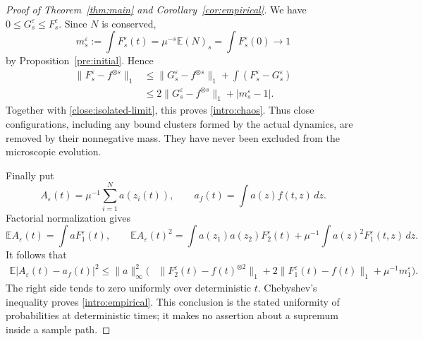 \begin{proof}[Proof of Theorem~\ref{thm:main} and Corollary~\ref{cor:empirical}]
We have $0\leq G_s^\varepsilon\leq F_s^\varepsilon$. Since
$N$ is conserved,
\[
 m_s^\varepsilon:=\int F_s^\varepsilon(t)
 =\mu^{-s}\mathbb E(N)_s
 =\int F_s^\varepsilon(0)\longrightarrow1
\]
by Proposition~\ref{pre:initial}. Hence
\begin{align*}
 \|F_s^\varepsilon-f^{\otimes s}\|_1
 &\leq\|G_s^\varepsilon-f^{\otimes s}\|_1
       +\int(F_s^\varepsilon-G_s^\varepsilon)\\
 &\leq2\|G_s^\varepsilon-f^{\otimes s}\|_1
       +|m_s^\varepsilon-1|.
\end{align*}
Together with \eqref{close:isolated-limit}, this proves
\eqref{intro:chaos}. Thus close configurations, including
any bound clusters formed by the actual dynamics, are removed
by their nonnegative mass. They have never been excluded from
the microscopic evolution.

Finally put
\[
 A_\varepsilon(t)=\mu^{-1}\sum_{i=1}^N a(z_i(t)),
 \qquad a_f(t)=\int a(z)f(t,z)\,dz.
\]
Factorial normalization gives
\[
 \mathbb E A_\varepsilon(t)=\int aF_1^\varepsilon(t),
 \qquad
 \mathbb E A_\varepsilon(t)^2
 =\int a(z_1)a(z_2)F_2^\varepsilon(t)
   +\mu^{-1}\int a(z)^2F_1^\varepsilon(t,z)\,dz.
\]
It follows that
\begin{align*}
 \mathbb E|A_\varepsilon(t)-a_f(t)|^2
 \leq\|a\|_\infty^2\bigl(&
 \|F_2^\varepsilon(t)-f(t)^{\otimes2}\|_1
 +2\|F_1^\varepsilon(t)-f(t)\|_1
 +\mu^{-1}m_1^\varepsilon\bigr).
\end{align*}
The right side tends to zero uniformly over deterministic $t$.
Chebyshev's inequality proves \eqref{intro:empirical}.
This conclusion is the stated uniformity of probabilities at
deterministic times; it makes no assertion about a supremum
inside a sample path.
\end{proof}
